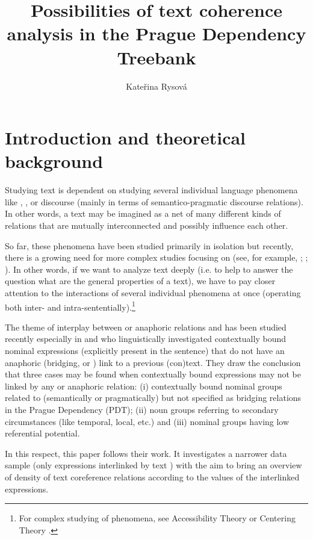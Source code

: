 \documentclass[output=paper]{langsci/langscibook.cls}
\title{Possibilities of text coherence analysis in the Prague Dependency Treebank}
\author{Kateřina Rysová \affiliation{Charles University, Faculty of Mathematics and Physics}}
\begin{document}
\section{Introduction and theoretical background\label{rysova_k:sec:Introduction}}

Studying text  is dependent on studying several individual language phenomena like , ,  or discourse (mainly in terms of semantico-pragmatic discourse relations). In other words, a text may be imagined as a net of many different kinds of relations that are mutually interconnected and possibly influence each other. 

So far, these phenomena have been studied primarily in isolation but recently, there is a growing need for more complex studies focusing on  (see, for example, \citealt{Hajicova2006, Hajicova2011}; \citealt{Eckert2010}; \citealt{Rysova2015Analyzing}). In other words, if we want to analyze text  deeply (i.e. to help to answer the question what are the general properties of a text), we have to pay closer attention to the interactions of several individual phenomena at once (operating both inter- and intra-sententially).\footnote{For complex studying of  phenomena, see Accessibility Theory \citep{ariel1988referring} or Centering Theory \citep{joshi1981control, grosz1986attention}.}  

The theme of interplay between  or anaphoric relations and  has been studied recently especially in \citet{NedoluzhkoHajicova2015} and \citet{Nedoluzhko2015} who linguistically investigated contextually bound nominal expressions (explicitly present in the sentence) that do not have an anaphoric (bridging,  or ) link to a previous (con)text. They draw the conclusion that three cases may be found when contextually bound expressions may not be linked by any  or anaphoric relation: (i) contextually bound nominal groups related to  (semantically or pragmatically) but not specified as bridging relations in the Prague Dependency  (PDT); (ii) noun groups referring to secondary circumstances (like temporal, local, etc.) and (iii) nominal groups having low referential potential.

In this respect, this paper follows their work. It investigates a narrower data sample (only expressions interlinked by text ) with the aim to bring an overview of density of text coreference relations according to the  values of the interlinked expressions.
\end{document}
